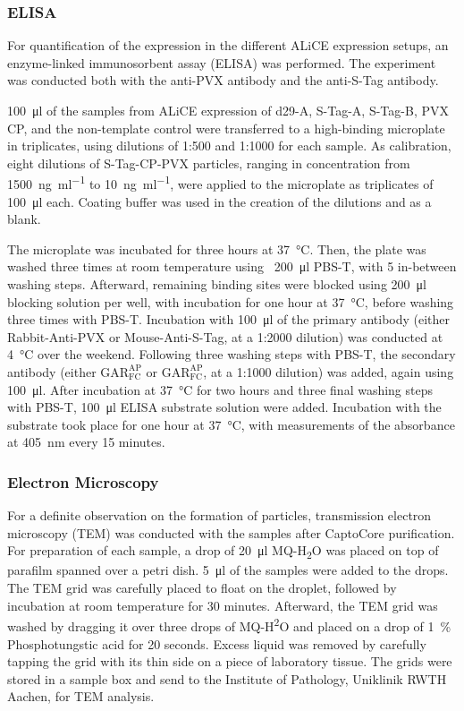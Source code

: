 \subsubsection{ELISA}
For quantification of the expression in the different ALiCE expression setups, an enzyme-linked immunosorbent assay (ELISA) was performed. The experiment was conducted both with the anti-PVX antibody and the anti-S-Tag antibody. 

\SI{100}{\micro\litre} of the samples from ALiCE expression of d29-A, S-Tag-A, S-Tag-B, PVX CP, and the non-template control were transferred to a high-binding microplate in triplicates, using dilutions of 1:500 and 1:1000 for each sample. As calibration, eight dilutions of S-Tag-CP-PVX particles, ranging in concentration from \SI{1500}{\nano\gram\per\milli\litre} to \SI{10}{\nano\gram\per\milli\litre}, were applied to the microplate as triplicates of \SI{100}{\micro\litre} each. Coating buffer was used in the creation of the dilutions and as a blank. 

The microplate was incubated for three hours at \SI{37}{\degreeCelsius}. Then, the plate was washed three times at room temperature using ~\SI{200}{\micro\litre} PBS-T, with \SI{5}{\min} in-between washing steps. Afterward, remaining binding sites were blocked using \SI{200}{\micro\litre} blocking solution per well, with incubation for one hour at \SI{37}{\degreeCelsius}, before washing three times with PBS-T. Incubation with \SI{100}{\micro\litre} of the primary antibody (either Rabbit-Anti-PVX or Mouse-Anti-S-Tag, at a 1:2000 dilution) was conducted at \SI{4}{\degreeCelsius} over the weekend. Following three washing steps with PBS-T, the secondary antibody (either $\mathrm{GAR}_{\mathrm{FC}}^{\mathrm{AP}}$ or $\mathrm{GAR}_{\mathrm{FC}}^{\mathrm{AP}}$, at a 1:1000 dilution) was added, again using \SI{100}{\micro\litre}. After incubation at \SI{37}{\degreeCelsius} for two hours and three final washing steps with PBS-T, \SI{100}{\micro\litre} ELISA substrate solution were added. Incubation with the substrate took place for one hour at \SI{37}{\degreeCelsius}, with measurements of the absorbance at \SI{405}{\nano\meter} every 15 minutes. 


\subsubsection{Electron Microscopy}
For a definite observation on the formation of particles, transmission electron microscopy (TEM) was conducted with the samples after CaptoCore purification. For preparation of each sample, a drop of \SI{20}{\micro\litre} MQ-H\textsubscript{2}O was placed on top of parafilm spanned over a petri dish. \SI{5}{\micro\litre} of the samples were added to the drops. The TEM grid was carefully placed to float on the droplet, followed by incubation at room temperature for 30 minutes. Afterward, the TEM grid was washed by dragging it over three drops of MQ-H\textsuperscript{2}O and placed on a drop of \SI{1}{\percent} Phosphotungstic acid for 20 seconds. Excess liquid was removed by carefully tapping the grid with its thin side on a piece of laboratory tissue. The grids were stored in a sample box and send to the Institute of Pathology, Uniklinik RWTH Aachen, for TEM analysis. 
